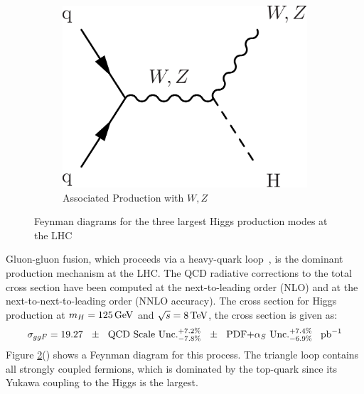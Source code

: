 \begin{figure}
      ~ %
      \begin{subfigure}[h]{0.3\textwidth}
        \includegraphics[width=\textwidth]{Figures/Feynman_Diagrams/higgs_production__vh.pdf}
        \caption{Associated Production with $W,Z$}\label{fig:higgs_production_vh}
      \end{subfigure}
      \caption{Feynman diagrams for the three largest Higgs production
        modes at the LHC} \label{fig:feynman_diagrams__higgs_production}
\end{figure}

\par Gluon-gluon fusion, which proceeds via a heavy-quark
loop~\cite{th:HiggsXS_2013}, is the dominant production mechanism at
the LHC.  The QCD radiative corrections to the total cross section have been computed
at the next-to-leading order (NLO) and at the next-to-next-to-leading order (NNLO
accuracy).  The cross section for Higgs production at $m_{H} =
125\,\text{Ge\hspace{-.08em}V}$ and $\sqrt{s}=8\,\text{Te\hspace{-.08em}V}$, the cross section is given as:
\begin{equation}\label{eq:ggf_xs}
\sigma_{ggF} = 19.27~~\pm \text{~~QCD Scale Unc.}^{+7.2\%}_{-7.8\%}~~\pm
\text{~~PDF+$\alpha_{S}$ Unc.}^{+7.4\%}_{-6.9\%}~~\mbox{\ensuremath{\,\text{pb}^\text{$-$1}}}
\end{equation}
\noindent Figure \ref{fig:feynman_diagrams__higgs_production}() shows a Feynman
diagram for this process.  The triangle loop contains all strongly
coupled fermions, which is dominated by the top-quark since its
Yukawa coupling to the Higgs is the largest.  

